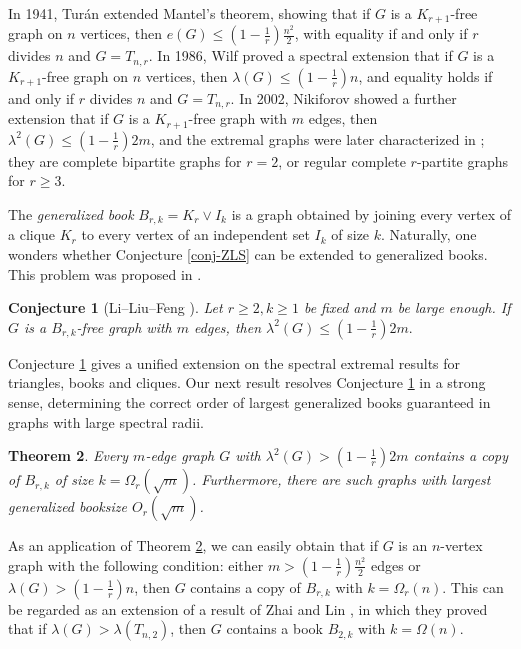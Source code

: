 \documentclass[11pt,a4paper]{article}
\newtheorem{theorem}{Theorem}[section]
\newtheorem{conj}[theorem]{Conjecture}
\theoremstyle{definition}
\theoremstyle{remark}
\begin{document}
In 1941, Tur\'{a}n \cite{Bol1978} extended Mantel's theorem, showing that if $G$ is a $K_{r+1}$-free graph on $n$ vertices, then $e(G)\le (1-\frac{1}{r})\frac{n^2}{2}$, with equality if and only if $r$ divides $n$ and $G=T_{n,r}$. In 1986, Wilf  \cite{Wil1986} proved a spectral extension that if $G$ is a $K_{r+1}$-free graph on $n$ vertices, then $\lambda (G) \le \left(1-\frac{1}{r }\right)n$, and equality holds if and only if $r$ divides $n$ and $G=T_{n,r}$. In 2002, Nikiforov \cite{Niki2002} showed a further extension that 
if $G$ is a $K_{r+1}$-free graph with $m$ edges,  then $\lambda^2 (G) \le 
 \left( 1-\frac{1}{r}\right)2m$, and
the extremal graphs were later characterized in \cite{Niki2006}; they are complete bipartite graphs for $r=2$, 
or regular complete $r$-partite graphs for $r\ge 3$. 

The \emph{generalized book} $B_{r,k}=K_r \vee I_k$ is a graph obtained  
 by joining every vertex of a clique $K_r$
to every vertex of an independent set $I_k$ of size $k$. Naturally, one wonders whether Conjecture \ref{conj-ZLS} can be extended to generalized books. This problem was proposed in \cite[Conjecture 1.20]{LLF2022}.

\begin{conj}[Li--Liu--Feng \cite{LLF2022}] \label{conj-B-rk}
Let $r\ge 2, k\ge 1$ be fixed and $m$ be large enough.  
If $G$ is a $B_{r,k}$-free graph with $m$ edges, 
then  $\lambda^2 (G)\le \left( 1-\frac{1}{r} \right) 2m.$ 
\end{conj}

Conjecture \ref{conj-B-rk} gives a unified 
extension on the spectral extremal results for triangles, books and cliques. 
Our next result resolves Conjecture \ref{conj-B-rk} in a strong sense, determining the correct order of largest generalized books guaranteed in graphs with large spectral radii.

\begin{theorem}
    \label{cor:joints}
    Every $m$-edge graph $G$ with $\lambda^2(G) > \left(1 - \frac{1}{r} \right)  2m$ contains a copy of $B_{r, k}$ of size $k = \Omega_r(\sqrt{m})$. 
    Furthermore, there are such graphs with largest generalized booksize $O_r(\sqrt{m})$.
\end{theorem}

As an application of Theorem \ref{cor:joints}, we can easily obtain that if $G$ is an $n$-vertex graph with the following condition: either $m> (1-\frac{1}{r})\frac{n^2}{2}$ edges or 
$\lambda (G)> (1-\frac{1}{r})n$, 
then $G$ contains a copy of $B_{r,k}$ 
with $k=\Omega_r(n)$. This can be regarded as an extension of a result of Zhai and Lin \cite{ZL2022jgt}, in which they proved that if $\lambda (G) > \lambda (T_{n,2})$, then $G$ contains a book $B_{2,k}$ with $k=\Omega(n)$. 
\end{document}

